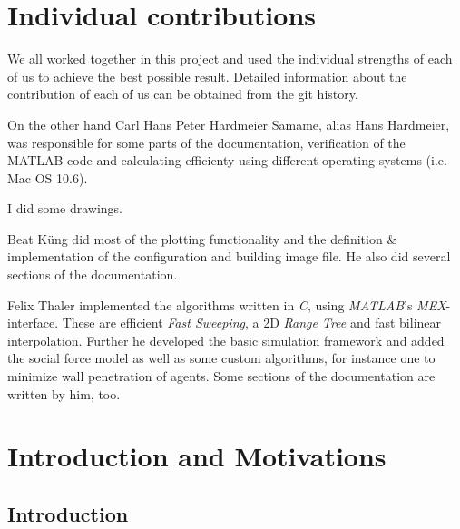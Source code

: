 \documentclass[11pt]{article}
\begin{document}


\section{Individual contributions}

We all worked together in this project and used the individual strengths of each
of us to achieve the best possible result. Detailed information about the
contribution of each of us can be obtained from the git history.

On the other hand Carl Hans Peter Hardmeier Samame, alias Hans Hardmeier, was 
responsible for some parts of the documentation, verification of the MATLAB-code
and calculating efficienty using different operating systems (i.e. Mac OS 10.6).

I did some drawings.


Beat K\"ung did most of the plotting functionality and the definition \&
implementation of the configuration and building image file. He also did several
sections of the documentation.

Felix Thaler implemented the algorithms written in \textit{C}, using \textit{MATLAB}'s \textit{MEX}-interface.
These are efficient \textit{Fast Sweeping}, a 2D \textit{Range Tree} and fast bilinear interpolation.
Further he developed the basic simulation framework and added the social force model as well as some
custom algorithms, for instance one to minimize wall penetration of agents. Some sections of the documentation are
written by him, too.


\section{Introduction and Motivations}

\subsection{Introduction}
\end{document}
